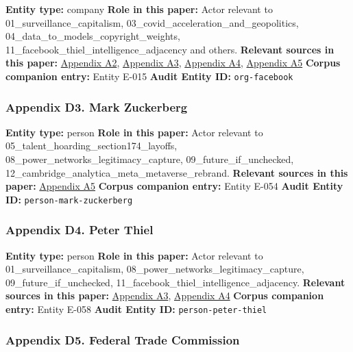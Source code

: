 \documentclass[
  american,
  11pt,
  letterpaper,
]{article}
\begin{document}
\textbf{Entity type:} company \textbf{Role in this paper:} Actor
relevant to 01\_surveillance\_capitalism,
03\_covid\_acceleration\_and\_geopolitics,
04\_data\_to\_models\_copyright\_weights,
11\_facebook\_thiel\_intelligence\_adjacency and others.
\textbf{Relevant sources in this paper:}
\hyperref[ch-01-appendix-a2-ftc-imposes-5-billion-penalty-and-sweeping-new-privacy-restrictions-on-facebook]{Appendix
A2},
\hyperref[ch-01-appendix-a3-facebook-inc-registration-statement-on-form-s-1]{Appendix
A3},
\hyperref[ch-01-appendix-a4-meta-platforms-inc-2022-definitive-proxy-statement]{Appendix
A4},
\hyperref[ch-01-appendix-a5-the-facebook-company-is-now-meta]{Appendix
A5} \textbf{Corpus companion entry:} Entity E-015 \textbf{Audit Entity
ID:} \texttt{org-facebook}

\subsubsection{Appendix D3. Mark
Zuckerberg}\label{ch-01-appendix-d3-mark-zuckerberg}

\textbf{Entity type:} person \textbf{Role in this paper:} Actor relevant
to 05\_talent\_hoarding\_section174\_layoffs,
08\_power\_networks\_legitimacy\_capture, 09\_future\_if\_unchecked,
12\_cambridge\_analytica\_meta\_metaverse\_rebrand. \textbf{Relevant
sources in this paper:}
\hyperref[ch-01-appendix-a5-the-facebook-company-is-now-meta]{Appendix
A5} \textbf{Corpus companion entry:} Entity E-054 \textbf{Audit Entity
ID:} \texttt{person-mark-zuckerberg}

\subsubsection{Appendix D4. Peter
Thiel}\label{ch-01-appendix-d4-peter-thiel}

\textbf{Entity type:} person \textbf{Role in this paper:} Actor relevant
to 01\_surveillance\_capitalism,
08\_power\_networks\_legitimacy\_capture, 09\_future\_if\_unchecked,
11\_facebook\_thiel\_intelligence\_adjacency. \textbf{Relevant sources
in this paper:}
\hyperref[ch-01-appendix-a3-facebook-inc-registration-statement-on-form-s-1]{Appendix
A3},
\hyperref[ch-01-appendix-a4-meta-platforms-inc-2022-definitive-proxy-statement]{Appendix
A4} \textbf{Corpus companion entry:} Entity E-058 \textbf{Audit Entity
ID:} \texttt{person-peter-thiel}

\subsubsection{Appendix D5. Federal Trade
Commission}\label{ch-01-appendix-d5-federal-trade-commission}
\end{document}
